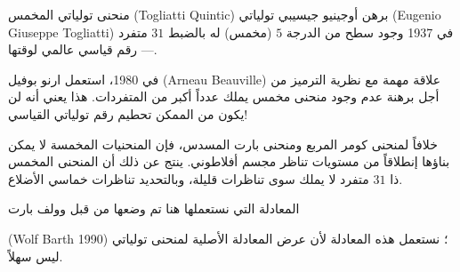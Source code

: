 \begin{surferPage}{منحنى تولياتي المخمس \textenglish{(Togliatti Quintic)}}
    برهن أوجينيو جيسيبي تولياتي %
    \textenglish{(Eugenio Giuseppe Togliatti)} %
   في 1937 وجود سطح من الدرجة $5$ (مخمس) له بالضبط $31$ متفرد--- رقم قياسي عالمي لوقتها.

    في 1980، استعمل ارنو بوفيل %
    \textenglish{(Arneau Beauville)} %
     علاقة مهمة مع نظرية الترميز من أجل برهنة عدم وجود منحنى مخمس يملك عدداً أكبر من المتفردات. 
    هذا يعني أنه لن يكون من الممكن تحطيم رقم تولياتي القياسي! 

   خلافاً لمنحنى كومر المربع ومنحنى بارت المسدس، فإن المنحنيات المخمسة لا يمكن بناؤها إنطلاقاً من مستويات تناظر مجسم أفلاطوني. ينتج عن ذلك أن المنحنى المخمس ذا $31$ متفرد لا يملك سوى تناظرات قليلة، وبالتحديد تناظرات خماسي الأضلاع.
   
    المعادلة التي نستعملها هنا تم وضعها من قبل وولف بارت %
    
    \textenglish{(Wolf Barth 1990)}%
    ؛ نستعمل هذه المعادلة لأن عرض المعادلة الأصلية لمنحنى تولياتي ليس سهلاً. 
\end{surferPage}